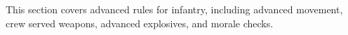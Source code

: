 This section covers advanced rules for infantry, including advanced movement, crew served weapons, advanced explosives, and morale checks.
